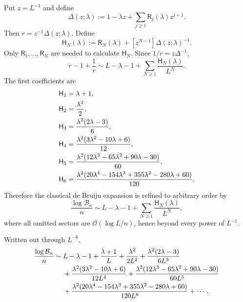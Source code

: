 \documentclass[11pt,a4paper]{article}
\theoremstyle{definition}
\theoremstyle{remark}
\newcommand{\Bell}{\mathcal B}
\newcommand{\BigO}{\mathcal O}
\newcommand{\coef}[2]{[#1^{#2}]}
\newcommand{\cR}{\mathsf R}
\newcommand{\cH}{\mathsf H}
\begin{document}
Put \(z=L^{-1}\) and define
\begin{equation}\label{eq:Dformal}
 \Delta(z;\lambda)
 :=1-\lambda z+\sum_{j\ge1}\cR_j(\lambda)z^{j+1}.
\end{equation}
Then \(r=z^{-1}\Delta(z;\lambda)\).  Define
\begin{equation}\label{eq:H-general}
 \boxed{
 \cH_N(\lambda):=
 \cR_N(\lambda)+\coef{z}{N-1}\Delta(z;\lambda)^{-1}.}
\end{equation}
Only \(\cR_1,\ldots,\cR_N\) are needed to calculate \(\cH_N\).  Since
\(1/r=z\Delta^{-1}\),
\begin{equation}\label{eq:F-polylog-general}
 r-1+\frac1r
 \sim L-\lambda-1+
       \sum_{N\ge1}\frac{\cH_N(\lambda)}{L^N}.
\end{equation}
The first coefficients are
\begin{align}
 \cH_1&=\lambda+1,\notag\\
 \cH_2&=\frac{\lambda^2}{2},\notag\\
 \cH_3&=\frac{\lambda^2(2\lambda-3)}6,\notag\\
 \cH_4&=\frac{\lambda^2(3\lambda^2-10\lambda+6)}{12},
 \label{eq:H-first}\\
 \cH_5&=\frac{\lambda^2(12\lambda^3-65\lambda^2+90\lambda-30)}{60},\notag\\
 \cH_6&=\frac{\lambda^2(20\lambda^4-154\lambda^3+355\lambda^2
                              -280\lambda+60)}{120}.\notag
\end{align}
Therefore the classical de Bruijn expansion is refined to arbitrary order by
\begin{equation}\label{eq:normalized-log-debruijn}
 \frac{\log\Bell_n}{n}
 \sim L-\lambda-1+
 \sum_{N\ge1}\frac{\cH_N(\lambda)}{L^N},
\end{equation}
where all omitted sectors are \(\BigO(\log L/n)\), hence beyond every power of
\(L^{-1}\).

Written out through \(L^{-6}\),
\begin{align}\label{eq:debruijn-many}
 \frac{\log\Bell_n}{n}
 \sim{}&L-\lambda-1+\frac{\lambda+1}{L}
 +\frac{\lambda^2}{2L^2}
 +\frac{\lambda^2(2\lambda-3)}{6L^3}\\
 &+\frac{\lambda^2(3\lambda^2-10\lambda+6)}{12L^4}
 +\frac{\lambda^2(12\lambda^3-65\lambda^2+90\lambda-30)}{60L^5}
 \notag\\
 &+\frac{\lambda^2(20\lambda^4-154\lambda^3+355\lambda^2
                              -280\lambda+60)}{120L^6}+\cdots.\notag
\end{align}
\end{document}
